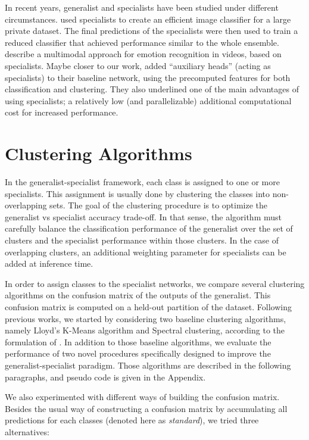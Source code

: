 \documentclass[12pt]{article}
\begin{document}
In recent years, generalist and specialists have been studied under
different circumstances. \cite{darkknowledge} used specialists to create
an efficient image classifier for a large private dataset. The final
predictions of the specialists were then used to train a reduced
classifier that achieved performance similar to the whole ensemble.
\cite{emonets} describe a multimodal approach for emotion recognition in
videos, based on specialists. Maybe closer to our work,
\cite{wardefarley} added ``auxiliary heads'' (acting as specialists) to
their baseline network, using the precomputed features for both
classification and clustering. They also underlined one of the main
advantages of using specialists; a relatively low (and parallelizable)
additional computational cost for increased performance.

\section{Clustering Algorithms}\label{clustering-algorithms}

In the generalist-specialist framework, each class is assigned to one or more
specialists. This assignment is usually done by clustering the classes into
non-overlapping sets. The goal of the clustering procedure is to optimize the
generalist vs specialist accuracy trade-off. In that sense, the algorithm must
carefully balance the classification performance of the generalist over the set
of clusters and the specialist performance within those clusters. In the case
of overlapping clusters, an additional weighting parameter for specialists can be added at
inference time.

In order to assign classes to the specialist networks, we compare
several clustering algorithms on the confusion matrix of the outputs of
the generalist. This confusion matrix is computed on a held-out
partition of the dataset. Following previous works, we started by
considering two baseline clustering algorithms, namely Lloyd's K-Means
algorithm and Spectral clustering, according to the formulation of
\cite{spectral}. In addition to those baseline algorithms, we evaluate
the performance of two novel procedures specifically designed to improve
the generalist-specialist paradigm. Those algorithms are described in
the following paragraphs, and pseudo code is given in the Appendix.

We also experimented with different ways of building the confusion matrix.
Besides the usual way of constructing a confusion matrix by accumulating all
predictions for each classes (denoted here as \emph{standard}), we tried three
alternatives:
\end{document}
